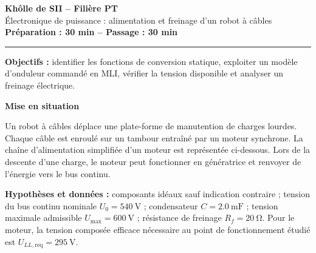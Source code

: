 \documentclass[11pt,a4paper]{article}
\newcommand{\partie}[1]{\vspace{0.7em}\noindent\textbf{\large #1}\par\vspace{0.25em}}
\begin{document}
\begin{center}
{\Large\bfseries Khôlle de SII -- Filière PT}\\[3pt]
{\large Électronique de puissance : alimentation et freinage d'un robot à câbles}\\[5pt]
\textbf{Préparation : 30 min \quad -- \quad Passage : 30 min}
\end{center}
\hrule\vspace{0.6em}
\textbf{Objectifs :} identifier les fonctions de conversion statique, exploiter un modèle d'onduleur commandé en MLI, vérifier la tension disponible et analyser un freinage électrique.

\partie{Mise en situation}
Un robot à câbles déplace une plate-forme de manutention de charges lourdes. Chaque câble est enroulé sur un tambour entraîné par un moteur synchrone. La chaîne d'alimentation simplifiée d'un moteur est représentée ci-dessous. Lors de la descente d'une charge, le moteur peut fonctionner en génératrice et renvoyer de l'énergie vers le bus continu.

\begin{center}
\end{center}

\textbf{Hypothèses et données :} composants idéaux sauf indication contraire ; tension du bus continu nominale $U_0=\SI{540}{\volt}$ ; condensateur $C=\SI{2.0}{\milli\farad}$ ; tension maximale admissible $U_{\max}=\SI{600}{\volt}$ ; résistance de freinage $R_f=\SI{20}{\ohm}$. Pour le moteur, la tension composée efficace nécessaire au point de fonctionnement étudié est $U_{LL,\mathrm{req}}=\SI{295}{\volt}$.
\end{document}
